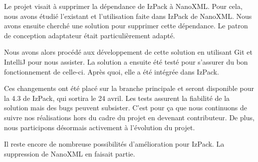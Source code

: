 Le projet visait à supprimer la dépendance de IzPack à NanoXML.
Pour cela, nous avons étudié l'existant et l'utilisation faite dans IzPack de NanoXML.
Nous avons ensuite cherché une solution pour supprimer cette dépendance.
Le patron de conception adaptateur était particulièrement adapté.

Nous avons alors procédé aux développement de cette solution en utilisant Git et IntelliJ pour nous assister.
La solution a ensuite été testé pour s'assurer du bon fonctionnement de celle-ci.
Après quoi, elle a été intégrée dans IzPack.

Ces changements ont été placé sur la branche principale et seront disponible pour la 4.3 de IzPack, qui sortira le 24 avril. Les tests assurent la fiabilité de la solution mais des bugs peuvent subsister.
C'est pour ça que nous continuons de suivre nos réalisations hors du cadre du projet en devenant contributeur.
De plus, nous participons désormais activement à l'évolution du projet.

Il reste encore de nombreuse possibilités d'amélioration pour IzPack.
La suppression de NanoXML en faisait partie.

